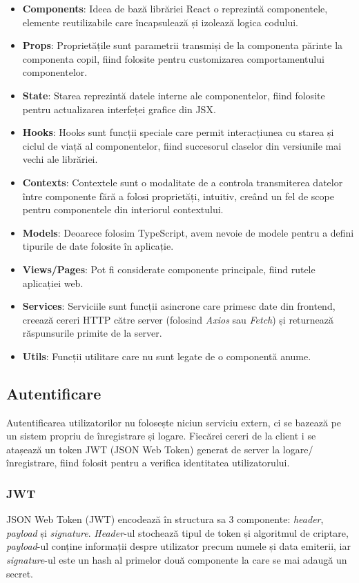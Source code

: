 \begin{itemize}
    \item \textbf{Components}: Ideea de bază librăriei React o reprezintă componentele, elemente
    reutilizabile care încapsulează și izolează logica codului.
    \item \textbf{Props}: Proprietățile sunt parametrii transmiși de la componenta părinte
    la componenta copil, fiind folosite pentru customizarea comportamentului componentelor.
    \item \textbf{State}: Starea reprezintă datele interne ale componentelor, fiind folosite pentru
    actualizarea interfeței grafice din JSX.
    \item \textbf{Hooks}: Hooks sunt funcții speciale care permit interacțiunea cu starea și ciclul
    de viață al componentelor, fiind succesorul claselor din versiunile mai vechi ale librăriei.
    \item \textbf{Contexts}: Contextele sunt o modalitate de a controla transmiterea datelor între
    componente fără a folosi proprietăți, intuitiv, creând un fel de scope pentru componentele din
    interiorul contextului.
    \item \textbf{Models}: Deoarece folosim TypeScript, avem nevoie de modele pentru a defini tipurile
    de date folosite în aplicație.
    \item \textbf{Views/Pages}: Pot fi considerate componente principale, fiind rutele aplicației web.
    \item \textbf{Services}: Serviciile sunt funcții asincrone care primesc date din frontend,
    creează cereri HTTP către server (folosind \textit{Axios} sau \textit{Fetch}) și returnează
    răspunsurile primite de la server.
    \item \textbf{Utils}: Funcții utilitare care nu sunt legate de o componentă anume.
\end{itemize}

\subsection{Autentificare}
Autentificarea utilizatorilor nu folosește niciun serviciu extern, ci se bazează pe un sistem
propriu de înregistrare și logare. Fiecărei cereri de la client i se atașează un token JWT
(JSON Web Token) generat de server la logare/înregistrare, fiind folosit pentru a verifica
identitatea utilizatorului. 

\subsubsection{JWT}
JSON Web Token (JWT) encodează în structura sa 3 componente: \textit{header}, \textit{payload} și \textit{signature}.
\textit{Header}-ul stochează tipul de token și algoritmul de criptare, \textit{payload}-ul conține informații
despre utilizator precum numele și data emiterii, iar \textit{signature}-ul este un hash al primelor
două componente la care se mai adaugă un secret.

